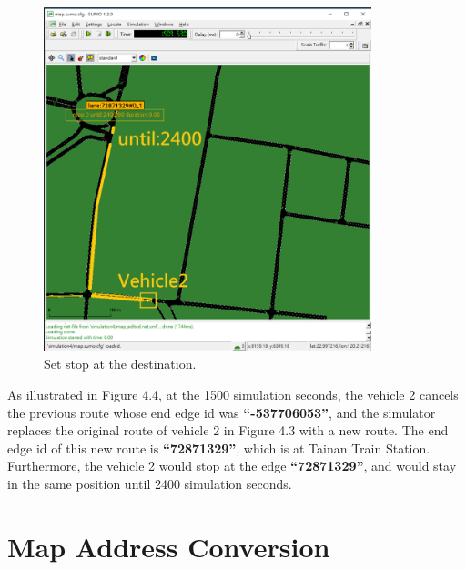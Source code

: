 \documentclass[12pt]{ksthesis}
\begin{document}
\begin{thesis}
{\begin{figure}[H]
\centering
\includegraphics[width=0.85\textwidth]{./Thesis_figures/F4-4_setStop.PNG}
\caption{\large Set stop at the destination.}
\vspace{0.5cm}
\label{Fig:Set_stop}
\end{figure}


As illustrated in Figure 4.4, at the 1500 simulation seconds, the vehicle 2 cancels the previous route whose end edge id was \textbf{“-537706053”}, and the simulator replaces the original route of vehicle 2 in Figure 4.3 with a new route. The end edge id of this new route is \textbf{“72871329”}, which is at Tainan Train Station. Furthermore, the vehicle 2 would stop at the edge \textbf{“72871329”}, and would stay in the same position until 2400 simulation seconds.



\section{Map Address Conversion}

}
\end{thesis}
\end{document}
